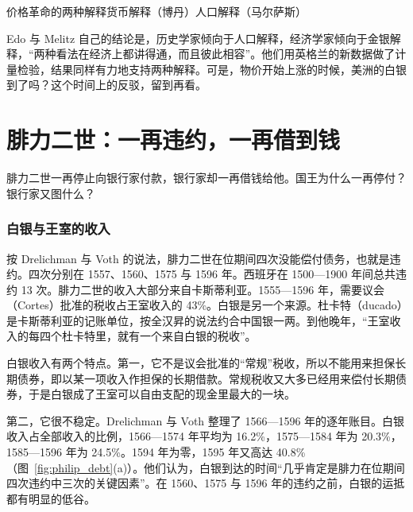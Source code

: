 \begin{compare}{价格革命的两种解释}{货币解释（博丹）}{人口解释（马尔萨斯）}
\end{compare}

Edo 与 Melitz 自己的结论是，历史学家倾向于人口解释，经济学家倾向于金银解释，“两种看法在经济上都讲得通，而且彼此相容”。他们用英格兰的新数据做了计量检验，结果同样有力地支持两种解释\cite{em2019}。可是，物价开始上涨的时候，美洲的白银到了吗？这个时间上的反驳，留到再看。

\section{腓力二世：一再违约，一再借到钱}\label{sec:silver-default}

腓力二世一再停止向银行家付款，银行家却一再借钱给他。国王为什么一再停付？银行家又图什么？

\subsubsection{白银与王室的收入}
按 Drelichman 与 Voth 的说法，腓力二世在位期间四次没能偿付债务，也就是违约。四次分别在 1557、1560、1575 与 1596 年\cite{dv2010}。西班牙在 1500—1900 年间总共违约 13 次\cite{dv2010}。腓力二世的收入大部分来自卡斯蒂利亚。1555—1596 年，需要议会（Cortes）批准的税收占王室收入的 43\%\cite{dv2010}。白银是另一个来源。杜卡特（ducado）是卡斯蒂利亚的记账单位，按全汉昇的说法约合中国银一两\cite{quan1969}。到他晚年，“王室收入的每四个杜卡特里，就有一个来自白银的税收”\cite{dv2010}。

白银收入有两个特点。第一，它不是议会批准的“常规”税收，所以不能用来担保长期债券，即以某一项收入作担保的长期借款。常规税收又大多已经用来偿付长期债券，于是白银成了王室可以自由支配的现金里最大的一块\cite{dv2010}。

第二，它很不稳定。Drelichman 与 Voth 整理了 1566—1596 年的逐年账目。白银收入占全部收入的比例，1566—1574 年平均为 16.2\%，1575—1584 年为 20.3\%，1585—1596 年为 24.5\%。1594 年为零，1595 年又高达 40.8\%（图~\ref{fig:philip_debt}(a)）\cite{dv2010}。他们认为，白银到达的时间“几乎肯定是腓力在位期间四次违约中三次的关键因素”。在 1560、1575 与 1596 年的违约之前，白银的运抵都有明显的低谷\cite{dv2010}。


